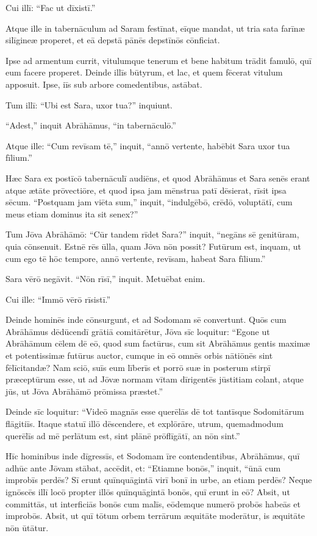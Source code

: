 Cui illī: ``Fac ut dīxistī.''

\Versus Atque ille in tabernāculum ad Saram festīnat, eīque mandat, ut tria sata farīnæ silīgineæ properet, et eā depstā pānēs depstīnōs cōnficiat.

\Versus Ipse ad armentum currit, vitulumque tenerum et bene habitum trādit famulō, quī eum facere properet.
\Versus Deinde illīs būtyrum, et lac, et quem fēcerat vitulum apposuit. Ipse, iīs sub arbore comedentibus, astābat.

\Versus Tum illī: ``Ubi est Sara, uxor tua?'' inquiunt.

``Adest,'' inquit Abrāhāmus, ``in tabernāculō.''

\Versus Atque ille: ``Cum revīsam tē,'' inquit, ``annō vertente, habēbit Sara uxor tua fīlium.''

Hæc Sara ex postīcō tabernāculī audiēns,
\Versus et quod Abrāhāmus et Sara senēs erant atque ætāte prōvectiōre, et quod ipsa jam mēnstrua patī dēsierat,
\Versus rīsit ipsa sēcum. ``Postquam jam viēta sum,'' inquit, ``indulgēbō, crēdō, voluptātī, cum meus etiam dominus ita sit senex?''

\Versus Tum Jōva Abrāhāmō: ``Cūr tandem rīdet Sara?'' inquit, ``negāns sē genitūram, quia cōnsenuit.
\Versus Estnē rēs ūlla, quam Jōva nōn possit? Futūrum est, inquam, ut cum ego tē hōc tempore, annō vertente, revīsam, habeat Sara fīlium.''

\Versus Sara vērō negāvit. ``Nōn rīsī,'' inquit. Metuēbat enim.

Cui ille: ``Immō vērō rīsistī.''

\Versus Deinde hominēs inde cōnsurgunt, et ad Sodomam sē convertunt. Quōs cum Abrāhāmus dēdūcendī grātiā comitārētur,
\Versus Jōva sīc loquitur: ``Egone ut Abrāhāmum cēlem dē eō, quod sum factūrus,
\Versus cum sit Abrāhāmus gentis maximæ et potentissimæ futūrus auctor, cumque in eō omnēs orbis nātiōnēs sint fēlīcitandæ?
\Versus Nam sciō, suīs eum līberīs et porrō suæ in posterum stirpī præceptūrum esse, ut ad Jōvæ normam vītam dīrigentēs jūstitiam colant, atque jūs, ut Jōva Abrāhāmō prōmissa præstet.''

\Versus Deinde sīc loquitur: ``Videō magnās esse querēlās dē tot tantīsque Sodomitārum flāgitiīs.
\Versus Itaque statuī illō dēscendere, et explōrāre, utrum, quemadmodum querēlīs ad mē perlātum est, sint plānē prōflīgātī, an nōn sint.''

\Versus Hīc hominibus inde dīgressīs, et Sodomam īre contendentibus, Abrāhāmus, quī adhūc ante Jōvam stābat,
\Versus accēdit, et: ``Etiamne bonōs,'' inquit, ``ūnā cum improbīs perdēs?
\Versus Sī erunt quīnquāgintā virī bonī in urbe, an etiam perdēs? Neque ignōscēs illī locō propter illōs quīnquāgintā bonōs, quī erunt in eō?
\Versus Absit, ut committās, ut interficiās bonōs cum malīs, eōdemque numerō probōs habeās et improbōs. Absit, ut quī tōtum orbem terrārum æquitāte moderātur, is æquitāte nōn ūtātur.

